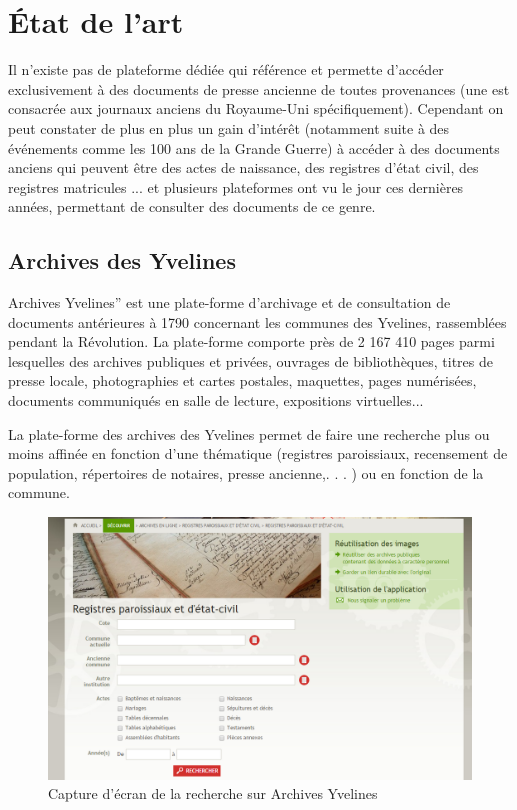 \section{État de l'art}
\label{sec:etat_art}
    Il n’existe pas de plateforme dédiée qui référence et permette d’accéder exclusivement à des documents de presse ancienne de toutes
    provenances (une est consacrée aux journaux anciens du Royaume-Uni spécifiquement). Cependant
    on peut constater de plus en plus un gain d’intérêt (notamment suite à des événements comme les 100 ans de la Grande Guerre)
    à accéder à des documents anciens qui peuvent être des actes de naissance, des registres d’état civil, des registres matricules ...
    et plusieurs plateformes ont vu le jour ces dernières années, permettant de consulter des documents de ce genre.


        \subsection{Archives des Yvelines}
        \label{subsec:yvelines}
        Archives Yvelines” est une plate-forme d’archivage et de consultation de documents antérieures à 1790
        concernant les communes des Yvelines, rassemblées pendant la Révolution. La plate-forme comporte près
        de 2 167 410 pages parmi lesquelles des archives publiques et privées, ouvrages de bibliothèques, titres de presse locale,
        photographies et cartes postales, maquettes, pages numérisées, documents communiqués en salle de lecture, expositions virtuelles...

        La plate-forme des archives des Yvelines permet de faire une recherche plus ou moins affinée en fonction d’une thématique
        (registres paroissiaux, recensement de population, répertoires de notaires, presse ancienne,. . . ) ou en fonction de la commune.

        \begin{figure}[h!]
            \centering
            \includegraphics[width=1\textwidth]{figure/screen_yvelines_recherche.png}
            \caption{Capture d'écran de la recherche sur Archives Yvelines}
            \label{fig:yvelines_recherche}
        \end{figure}

